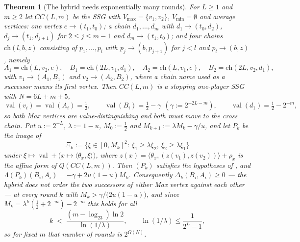 \documentclass[11pt]{article}
\theoremstyle{plain}
\newtheorem{theorem}{Theorem}[section]
\theoremstyle{definition}
\DeclareMathOperator{\val}{val}
\newcommand{\Vmax}{V_{\max}}
\newcommand{\Vmin}{V_{\min}}
\begin{document}
\begin{theorem}[The hybrid needs exponentially many rounds]\label{thm:hybrid-lower}
For $L\ge1$ and $m\ge2$ let $CC(L,m)$ be the SSG with
$\Vmax=\{v_1,v_2\}$, $\Vmin=\emptyset$ and average vertices: one vertex
$e\to(t_1,t_0)$; a chain $d_1,\dots,d_m$ with $d_1\to(t_0,d_2)$,
$d_j\to(t_1,d_{j+1})$ for $2\le j\le m-1$ and $d_m\to(t_1,t_0)$; and four chains
$\mathrm{ch}(l,b,z)$ consisting of $p_1,\dots,p_l$ with $p_j\to(b,p_{j+1})$ for
$j<l$ and $p_l\to(b,z)$, namely
\[
  A_1=\mathrm{ch}(L,v_2,e),\quad B_1=\mathrm{ch}(2L,v_1,d_1),\quad
  A_2=\mathrm{ch}(L,v_1,e),\quad B_2=\mathrm{ch}(2L,v_2,d_1),
\]
with $v_1\to(A_1,B_1)$ and $v_2\to(A_2,B_2)$, where a chain name used as a
successor means its first vertex. Then $CC(L,m)$ is a stopping one-player SSG
with $N=6L+m+5$,
\[
  \val(v_i)=\val(A_i)=\tfrac12,\qquad
  \val(B_i)=\tfrac12-\gamma\ \ (\gamma:=2^{-2L-m}),\qquad
  \val(d_1)=\tfrac12-2^{-m},
\]
so both Max vertices are value-distinguishing and both must move to the
\emph{cross} chain. Put $u:=2^{-L}$, $\lambda:=1-u$, $M_0:=\tfrac12$ and
$M_{k+1}:=\lambda M_k-\gamma/u$, and let $P_k$ be the image of
\[
  \Xi_k:=\{\xi\in[0,M_k]^2:\ \xi_1\ge\lambda\xi_2,\ \xi_2\ge\lambda\xi_1\}
\]
under $\xi\mapsto\val+\bigl(x\mapsto\langle\theta_x,\xi\rangle\bigr)$, where
$z(x)=\langle\theta_x,(z(v_1),z(v_2))\rangle+\rho_x$ is the affine form of
$Q(CC(L,m))$. Then $(P_k)$ satisfies the hypotheses of
, and
$\Lambda(P_k)(B_i,A_i)=-\gamma+2u(1-u)M_k$. Consequently
$\Delta_k(B_i,A_i)\ge0$ --- the hybrid does not order the two successors of
either Max vertex against each other --- at every round $k$ with
$M_k>\gamma/\bigl(2u(1-u)\bigr)$, and since
$M_k=\lambda^{k}(\tfrac12+2^{-m})-2^{-m}$ this holds for all
\[
  k\;<\;\frac{(m-\log_23)\ln2}{\ln(1/\lambda)},
  \qquad \ln(1/\lambda)\le\frac1{2^{L}-1},
\]
so for fixed $m$ that number of rounds is $2^{\Omega(N)}$.
\end{theorem}
\end{document}
